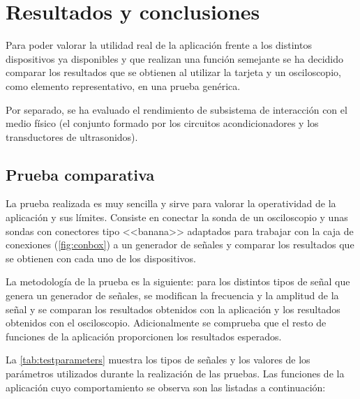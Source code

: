\chapter{Resultados y conclusiones}\label{chap:part1conclusions}

Para poder valorar la utilidad real de la aplicación frente a los distintos
dispositivos ya disponibles y que realizan una función semejante se ha
decidido comparar los resultados que se obtienen al utilizar la tarjeta y
un osciloscopio, como elemento representativo, en una prueba genérica.

Por separado, se ha evaluado el rendimiento de subsistema de interacción
con el medio físico (el conjunto formado por los circuitos acondicionadores
y los transductores de ultrasonidos).


\section{Prueba comparativa}\label{sec:working-test}

La prueba realizada es muy sencilla y sirve para valorar la operatividad de
la aplicación y sus límites. Consiste en conectar la sonda de un
osciloscopio y unas sondas con conectores tipo <<banana>> adaptados para
trabajar con la caja de conexiones (\vref{fig:conbox}) a un generador de
señales y comparar los resultados que se obtienen con cada uno de los
dispositivos.

La metodología de la prueba es la siguiente: para los distintos tipos de
señal que genera un generador de señales, se modifican la frecuencia y la
amplitud de la señal y se comparan los resultados obtenidos con la
aplicación y los resultados obtenidos con el osciloscopio. Adicionalmente
se comprueba que el resto de funciones de la aplicación proporcionen los
resultados esperados.

La \cref{tab:testparameters} muestra los tipos de señales y los valores de
los parámetros utilizados durante la realización de las pruebas. Las
funciones de la aplicación cuyo comportamiento se observa son las listadas
a continuación:

